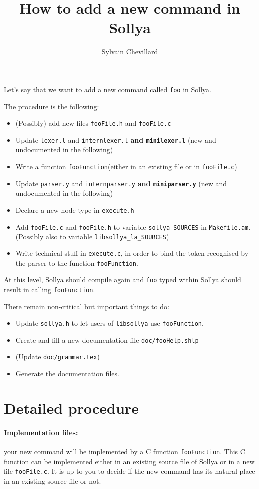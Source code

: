 \documentclass{article}
\title{How to add a new command in Sollya}
\author{Sylvain Chevillard}
\newcommand{\commandName}{\texttt{foo}\xspace}
\newcommand{\commandFunction}{\texttt{fooFunction}\xspace}
\newcommand{\commandFile}[1]{\texttt{fooFile#1}\xspace}
\newcommand{\commandShlp}{\texttt{doc/fooHelp.shlp}\xspace}
\begin{document}
\maketitle

Let's say that we want to add a new command called \commandName in Sollya.

The procedure is the following:
\begin{itemize}
\item (Possibly) add new files \commandFile{.h} and \commandFile{.c}
\item Update \texttt{lexer.l} and \texttt{internlexer.l} \textbf{and \texttt{minilexer.l}} (new and undocumented in the following)
\item Write a function \commandFunction (either in an existing file or in \commandFile{.c})
\item Update \texttt{parser.y} and \texttt{internparser.y} \textbf{and \texttt{miniparser.y}} (new and undocumented in the following)
\item Declare a new node type in \texttt{execute.h}
\item Add \commandFile{.c} and \commandFile{.h} to variable \texttt{sollya\_SOURCES} in \texttt{Makefile.am}. (Possibly also to variable \texttt{libsollya\_la\_SOURCES})
\item Write technical stuff in \texttt{execute.c}, in order to bind the token recognised by the parser to the function \commandFunction.
\end{itemize}

At this level, Sollya should compile again and \commandName typed within Sollya should result in calling \commandFunction.

There remain non-critical but important things to do:
\begin{itemize}
\item Update \texttt{sollya.h} to let users of \texttt{libsollya} use \commandFunction.
\item Create and fill a new documentation file \commandShlp
\item (Update \texttt{doc/grammar.tex})
\item Generate the documentation files.
\end{itemize}

\section{Detailed procedure}
\paragraph{Implementation files: } your new command will be implemented by a C function \commandFunction. This C function can be implemented either in an existing source file of Sollya or in a new file \commandFile{.c}. It is up to you to decide if the new command has its natural place in an existing source file or not.
\end{document}
